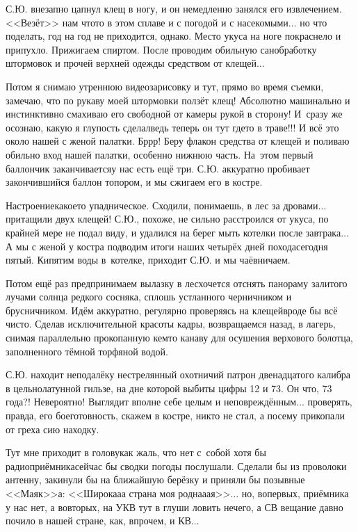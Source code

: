 С.Ю. внезапно цапнул клещ в ногу, и он немедленно занялся его извлечением. <<Везёт>> нам что\sdash то в этом сплаве и с погодой и с насекомыми$\ldots$ но что поделать, год на год не приходится, однако. Место укуса на ноге покраснело и припухло. Прижигаем спиртом. После проводим обильную санобработку штормовок и прочей верхней одежды средством от клещей$\ldots$
 
Потом я снимаю утреннюю видеозарисовку и тут, прямо во время съемки, замечаю, что по рукаву моей штормовки ползёт клещ! Абсолютно машинально и инстинктивно смахиваю его свободной от камеры рукой в сторону! И~сразу же осознаю, какую я глупость сделал\mdash ведь теперь он тут где\sdash то в траве!!! И всё это около нашей с женой палатки. Бр\sdash р\sdash р! Беру флакон средства от клещей и поливаю обильно вход нашей палатки, особенно нижнюю часть. На~этом первый баллончик заканчивается\mdash у нас есть ещё три. С.Ю. аккуратно пробивает закончившийся баллон топором, и мы сжигаем его в костре. 

Настроение\mdash какое\sdash то упадническое. Сходили, понимаешь, в лес за дровами$\ldots$ притащили двух клещей! С.Ю., похоже, не сильно расстроился от укуса, по крайней мере не подал виду, и удалился на берег мыть котелки после завтрака$\ldots$ А мы с женой у костра подводим итоги наших четырёх дней похода\mdash сегодня пятый. Кипятим воды в~котелке, приходит С.Ю. и мы чаёвничаем.

Потом ещё раз предпринимаем вылазку в лес\mdash хочется отснять панораму залитого лучами солнца редкого сосняка, сплошь устланного черничником и брусничником. Идём аккуратно, регулярно проверяясь на клещей\mdash вроде бы всё чисто. Сделав исключительной красоты кадры, возвращаемся назад, в лагерь, снимая параллельно прокопанную кем\sdash то канаву для осушения верхового болотца, заполненного тёмной торфяной водой.

С.Ю. находит неподалёку нестрелянный охотничий патрон двенадцатого калибра в цельнолатунной гильзе, на дне которой выбиты цифры 12 и 73. Он что, 73 года?! Невероятно! Выглядит вполне себе целым и неповреждённым$\ldots$ проверять, правда, его боеготовность, скажем в костре, никто не стал, а посему прикопали от греха сию находку. 

Тут мне приходит в голову\mdash как жаль, что нет с~собой хотя бы радиоприёмника\mdash сейчас бы сводки погоды послушали. Сделали бы из проволоки антенну, закинули бы на ближайшую берёзку и приняли бы позывные <<Маяк>>\sdash а: <<Широка\sdash а\sdash а страна моя родна\sdash а\sdash ая>>$\ldots$ но, во\sdash первых, приёмника у нас нет, а во\sdash вторых, на УКВ тут в глуши ловить нечего, а СВ вещание давно почило в нашей стране, как, впрочем, и КВ$\ldots$

